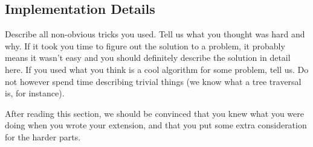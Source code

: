 \subsection{Implementation Details}
\label{sec:details}
Describe all non-obvious tricks you used. Tell us what you thought was hard and
why. If it took you time to figure out the solution to a problem, it probably
means it wasn't easy and you should definitely describe the solution in detail
here. If you used what you think is a cool algorithm for some problem, tell us.
Do not however spend time describing trivial things (we know what a tree traversal
is, for instance).

After reading this section, we should be convinced that you knew what you were
doing when you wrote your extension, and that you put some extra consideration
for the harder parts.

